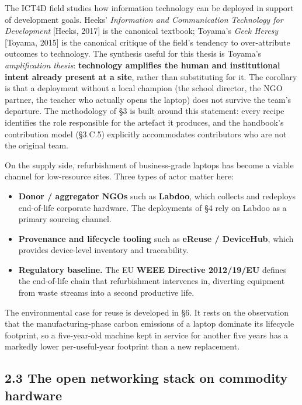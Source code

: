 The ICT4D field studies how information technology can be deployed in
support of development goals. Heeks' \emph{Information and Communication
Technology for Development} {[}Heeks, 2017{]} is the canonical textbook;
Toyama's \emph{Geek Heresy} {[}Toyama, 2015{]} is the canonical critique
of the field's tendency to over-attribute outcomes to technology. The
synthesis useful for this thesis is Toyama's \emph{amplification
thesis}: \textbf{technology amplifies the human and institutional intent
already present at a site}, rather than substituting for it. The
corollary is that a deployment without a local champion (the school
director, the NGO partner, the teacher who actually opens the laptop)
does not survive the team's departure. The methodology of §3 is built
around this statement: every recipe identifies the role responsible for
the artefact it produces, and the handbook's contribution model (§3.C.5)
explicitly accommodates contributors who are not the original team.

On the supply side, refurbishment of business-grade laptops has become a
viable channel for low-resource sites. Three types of actor matter here:

\begin{itemize}
\tightlist
\item
  \textbf{Donor / aggregator NGOs} such as \textbf{Labdoo}, which
  collects and redeploys end-of-life corporate hardware. The deployments
  of §4 rely on Labdoo as a primary sourcing channel.
\item
  \textbf{Provenance and lifecycle tooling} such as \textbf{eReuse /
  DeviceHub}, which provides device-level inventory and traceability.
\item
  \textbf{Regulatory baseline.} The EU \textbf{WEEE Directive
  2012/19/EU} defines the end-of-life chain that refurbishment
  intervenes in, diverting equipment from waste streams into a second
  productive life.
\end{itemize}

The environmental case for reuse is developed in §6. It rests on the
observation that the manufacturing-phase carbon emissions of a laptop
dominate its lifecycle footprint, so a five-year-old machine kept in
service for another five years has a markedly lower per-useful-year
footprint than a new replacement.

\hypertarget{the-open-networking-stack-on-commodity-hardware}{%
\subsection{2.3 The open networking stack on commodity
hardware}\label{the-open-networking-stack-on-commodity-hardware}}

